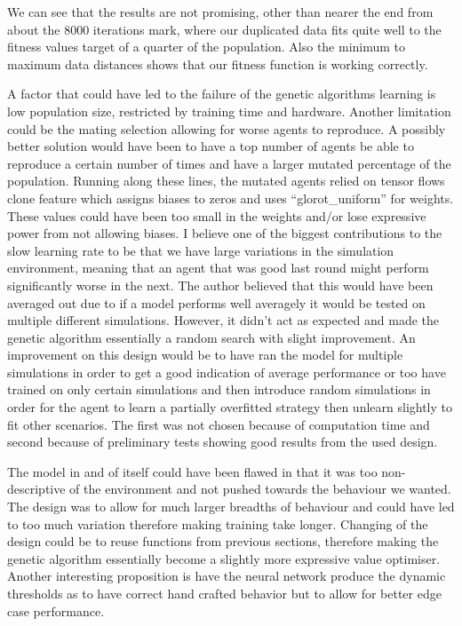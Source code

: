 \documentclass{UoYCSproject}
\begin{document}
We can see that the results are not promising, other than nearer the end from about the 8000 iterations mark, where our duplicated data fits quite well to the fitness values target of a quarter of the population. 
Also the minimum to maximum data distances shows that our fitness function is working correctly.

A factor that could have led to the failure of the genetic algorithms learning is low population size, restricted by training time and hardware. 
Another limitation could be the mating selection allowing for worse agents to reproduce. 
A possibly better solution would have been to have a top number of agents be able to reproduce a certain number of times and have a larger mutated percentage of the population.
Running along these lines, the mutated agents relied on tensor flows clone feature which assigns biases to zeros and uses “glorot\_uniform” for weights. 
These values could have been too small in the weights and/or lose expressive power from not allowing biases. 
I believe one of the biggest contributions to the slow learning rate to be that we have large variations in the simulation environment, meaning that an agent that was good last round might perform significantly worse in the next. 
The author believed that this would have been averaged out due to if a model performs well averagely it would be tested on multiple different simulations. 
However, it didn’t act as expected and made the genetic algorithm essentially a random search with slight improvement. 
An improvement on this design would be to have ran the model for multiple simulations in order to get a good indication of average performance or too have trained on only certain simulations and then introduce random simulations in order for the agent to learn a partially overfitted strategy then unlearn slightly to fit other scenarios. 
The first was not chosen because of computation time and second because of preliminary tests showing good results from the used design.

The model in and of itself could have been flawed in that it was too non-descriptive of the environment and not pushed towards the behaviour we wanted. 
The design was to allow for much larger breadths of behaviour and could have led to too much variation therefore making training take longer. 
Changing of the design could be to reuse functions from previous sections, therefore making the genetic algorithm essentially become a slightly more expressive value optimiser. 
Another interesting proposition is have the neural network produce the dynamic thresholds as to have correct hand crafted behavior but to allow for better edge case performance.
\end{document}
